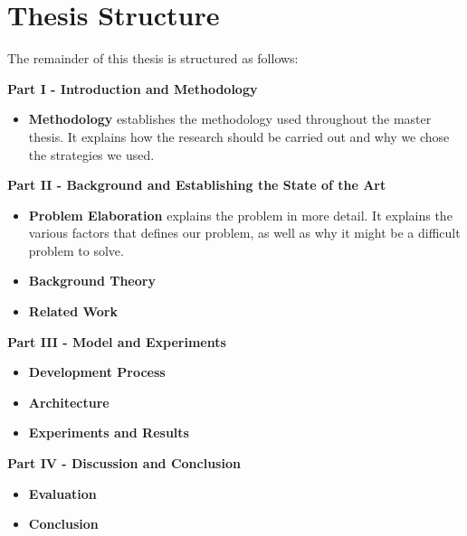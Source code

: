 
\section{Thesis Structure}
The remainder of this thesis is structured as follows:

\noindent
\begin{minipage}{\linewidth}
    \textbf{Part I - Introduction and Methodology}
    \begin{itemize}
        \item\textbf{Methodology} establishes the methodology used throughout the master thesis. It explains how the research should be carried out and why we chose the strategies we used.
    \end{itemize}
\end{minipage}

\vspace{0.5cm}\noindent
\begin{minipage}{\linewidth}
    \textbf{Part II - Background and Establishing the State of the Art}
    \begin{itemize}
        \item\textbf{Problem Elaboration} explains the problem in more detail. It explains the various factors that defines our problem, as well as why it might be a difficult problem to solve.
        \item\textbf{Background Theory} 
        \item\textbf{Related Work} 
    \end{itemize}
\end{minipage}

\vspace{0.5cm}\noindent
\begin{minipage}{\linewidth}
    \textbf{Part III - Model and Experiments}
    \begin{itemize}
        \item\textbf{Development Process} 
        \item\textbf{Architecture} 
        \item\textbf{Experiments and Results} 
    \end{itemize}
\end{minipage}

\vspace{0.5cm}\noindent
\begin{minipage}{\linewidth}
    \textbf{Part IV - Discussion and Conclusion}
    \begin{itemize}
        \item\textbf{Evaluation} 
        \item\textbf{Conclusion} 
    \end{itemize}
\end{minipage}